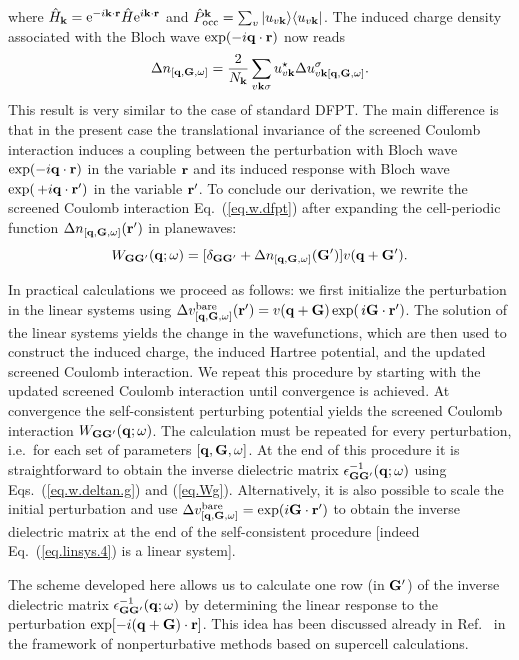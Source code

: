 \documentclass[twocolumn,prb,showpacs,superscriptaddress]{revtex4}
\def\s1{\hspace{0.5cm}}
\def\s2{\hspace{1cm}}
\def\w{\omega}
\def\H{\hat{H}}
\def\P{\hat{P}_{\rm occ}}
\def\q{{\bf q}}
\def\s{\sigma}
\def\k{{\bf k}}
\def\G{{\bf G}}
\def\Gp{{\bf G^\prime}}
\def\r{{\bf r}}
\def\rp{{\bf r^\prime}}
\begin{document}
where $\H_\k= {\rm e}^{-i\k\cdot\r} \H {\rm e}^{i\k\cdot\r}$ and
$\P^\k=\sum_v | u_{v\k} \rangle \langle u_{v\k}|$.
The induced charge density associated with the Bloch wave ${\rm exp}(-i\q\cdot\r)$ 
now reads 
  \begin{equation} \label{eq.deltan.bloch}
  \Delta n_{[\q,\G,\w]} = \frac{2}{N_\k}\sum_{v\k\s} u_{v\k}^\star  \Delta u^\s_{v\k[\q,\G,\w]}.
  \end{equation}
This result is very similar to the case of standard DFPT.\cite{baroni.rmp} 
The main difference is that in the present case the translational invariance 
of the screened Coulomb interaction induces a coupling between the perturbation 
with Bloch wave ${\rm exp}(-i\q\cdot\r)$ in the variable $\r$ and its induced
response with Bloch wave ${\rm exp}(\,+i\q\cdot\rp)$ in the variable $\rp$.
%
To conclude our derivation, we rewrite the screened Coulomb interaction 
Eq.\ (\ref{eq.w.dfpt}) after expanding the cell-periodic function 
$\Delta n_{[\q,\G,\w]}(\rp)$ in planewaves:
  \begin{equation}\label{eq.w.deltan.g}
  W_{\G\Gp}(\q;\w) = [\delta_{\G\Gp} + \Delta n_{[\q,\G,\w]}(\Gp) ]v(\q+\Gp).
  \end{equation}

In practical calculations we proceed as follows: we first initialize the perturbation
in the linear systems using 
$\Delta v^{\rm bare}_{[\q,\G,\w]}(\rp) = v(\q+\G) \, {\rm exp}(\,i\G\cdot\rp)$.
The solution of the linear systems yields the change in the wavefunctions,
which are then used to construct the induced charge, the induced Hartree potential,
and the updated screened Coulomb interaction. We repeat this procedure by starting with
the updated screened Coulomb interaction until convergence is achieved.
At convergence the self-consistent perturbing potential yields
the screened Coulomb interaction $W_{\G\Gp}(\q;\w)$.
The calculation must be repeated for every perturbation, i.e.\ for
each set of parameters $[\q,\G,\w]$.
%
At the end of this procedure it is straightforward to obtain the inverse dielectric matrix 
$\epsilon^{-1}_{\G\Gp}(\q;\w)$ using Eqs.~(\ref{eq.w.deltan.g}) and 
(\ref{eq.Wg}). Alternatively, it is also possible to scale the initial
perturbation and use $\Delta v^{\rm bare}_{[\q,\G,\w]} = {\rm exp}(i\G\cdot\rp)$
to obtain the inverse dielectric matrix at the end of the self-consistent procedure
[indeed Eq.~(\ref{eq.linsys.4}) is a linear system].

The scheme developed here allows us to calculate one row (in $\Gp$) of the inverse 
dielectric matrix $\epsilon^{-1}_{\G\Gp}(\q;\w)$ by determining the linear response to the
perturbation ${\rm exp}[-i(\q+\G)\cdot\r]$. This idea has been discussed already
in Ref.\  in the framework of nonperturbative methods
based on supercell calculations.
\end{document}
